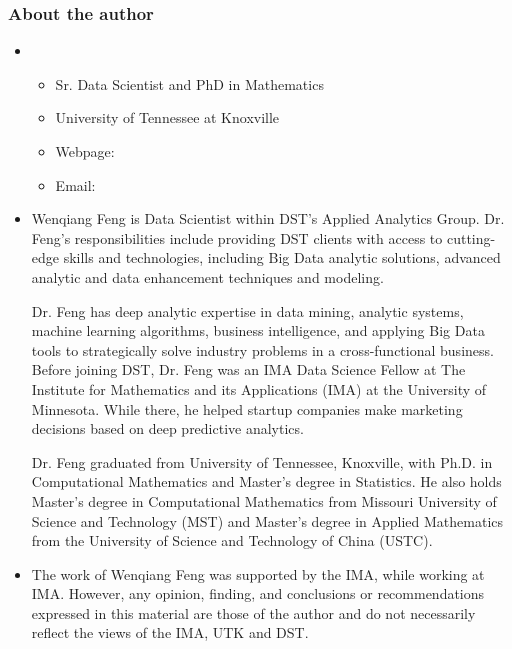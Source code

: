 \documentclass[letterpaper,11pt,english]{sphinxmanual}
\begin{document}
\subsubsection{About the author}
\label{\detokenize{preface:about-the-author}}\begin{itemize}
\item {} 
\begin{itemize}
\item {} 
Sr. Data Scientist and PhD in Mathematics

\item {} 
University of Tennessee at Knoxville

\item {} 
Webpage: 

\item {} 
Email: 

\end{itemize}

\item {} 

Wenqiang Feng is Data Scientist within DST’s Applied Analytics Group. Dr. Feng’s responsibilities include providing
DST clients with access to cutting-edge skills and technologies, including Big Data analytic solutions, advanced
analytic and data enhancement techniques and modeling.

Dr. Feng has deep analytic expertise in data mining, analytic systems, machine learning algorithms, business
intelligence, and applying Big Data tools to strategically solve industry problems in a cross-functional business.
Before joining DST, Dr. Feng was an IMA Data Science Fellow at The Institute for Mathematics and its
Applications (IMA) at the University of Minnesota. While there, he helped startup companies make marketing
decisions based on deep predictive analytics.

Dr. Feng graduated from University of Tennessee, Knoxville, with Ph.D. in Computational Mathematics and Master’s
degree in Statistics. He also holds Master’s degree in Computational Mathematics from Missouri University of
Science and Technology (MST) and Master’s degree in Applied Mathematics from the University of Science and
Technology of China (USTC).

\item {} 

The work of Wenqiang Feng was supported by the IMA, while working at IMA. However, any opinion, finding,
and conclusions or recommendations expressed in this material are those of the author and do not necessarily
reflect the views of the IMA, UTK and DST.

\end{itemize}
\end{document}
